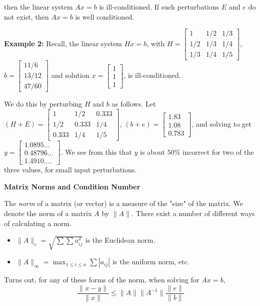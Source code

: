 \documentclass [titlepage,12pt,letter] {article}
\begin{document}
then the linear system $Ax=b$ is ill-conditioned. If such perturbations $E$ and $e$ do not exist, then $Ax=b$ is well conditioned.

{\bf Example 2:} Recall, the linear system $Hx=b$, with $H=\begin{bmatrix} 1 &	1/2 & 1/3 \\ 1/2	 & 1/3 & 1/4 \\ 1/3 & 1/4 & 1/5 \end{bmatrix}$, $b=\begin{bmatrix} 11/6 \\ 13/12 \\ 47/60 \end{bmatrix}$ and solution $x=\begin{bmatrix} 1 \\ 1 \\ 1 \end{bmatrix}$, is ill-conditioned. 

We do this by perturbing $H$ and $b$ as follows. Let $(H+E)=\begin{bmatrix} 1 &	1/2 & 0.333 \\ 1/2	 & 0.333 & 1/4 \\ 0.333 & 1/4 & 1/5 \end{bmatrix}$, $(b+e)=\begin{bmatrix} 1.83 \\ 1.08 \\ 0.783 \end{bmatrix}$, and solving to get $y=\begin{bmatrix} 1.0895... \\ 0.48796... \\ 1.4910.... \end{bmatrix}$. We see from this that $y$ is about $50\%$ incorrect for two of the three values, for small input perturbations.

{\bf Matrix Norms and Condition Number}

The {\it norm} of a matrix (or vector) is a measure of the "size" of the matrix. We denote the norm of a matrix $A$ by $\|A\|$. There exist a number of different ways of calculating a norm.
\begin{itemize}
\item{$\|A\|_e=\sqrt{\sum{\sum{a_{ij}^2}}}$ is the Euclidean norm.}
\item{$\|A\|_{\infty}=\displaystyle \max_{1 \leq i \leq n}{\sum{|a_{ij}|}}$ is the uniform norm, etc.}
\end{itemize}
Turns out, for any of these forms of the norm, when solving for $Ax=b$,
\[
\frac{\|x-y\|}{\|x\|} \leq \|A\|\|A^{-1}\|\frac{\|e\|}{\|b\|}
\]
\end{document}
